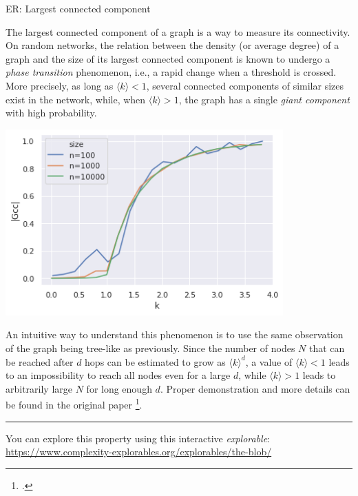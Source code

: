 \documentclass[a4paper,11pt]{book}
\begin{document}
\begin{textbox}{ER: Largest connected component}

The largest connected component of a graph is a way to measure its connectivity. On random networks, the relation between the density (or average degree) of a graph and the size of its largest connected component is known to undergo a \textit{phase transition} phenomenon, i.e., a rapid change when a threshold is crossed. More precisely, as long as $\langle k \rangle<1$, several connected components of similar sizes exist in the network, while, when  $\langle k \rangle>1$, the graph has a single \textit{giant component} with high probability.

\begin{center}
\includegraphics[width=0.8\textwidth]{pics/largestCC.png}
\end{center}

An intuitive way to understand this phenomenon is to use the same observation of the graph being tree-like as previously. Since the number of nodes $N$ that can be reached after $d$ hops can be estimated to grow as $\langle k \rangle^d$, a value of $\langle k \rangle<1$ leads to an impossibility to reach all nodes even for a large $d$, while $\langle k \rangle>1$ leads to arbitrarily large $N$ for long enough $d$. Proper demonstration and more details can be found in the original paper  \footcite{erdHos1960evolution}.

\noindent\rule{4cm}{0.1pt}

You can explore this property using this interactive \textit{explorable}: \url{https://www.complexity-explorables.org/explorables/the-blob/}
\end{textbox}
\end{document}
